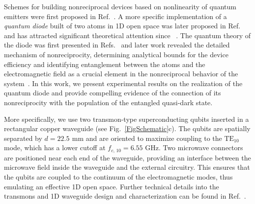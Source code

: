 \documentclass[pra, twocolumn, amsmath, amssymb, notitlepage, longbibliography, showpacs, superscriptaddress]{revtex4-1}
\begin{document}

Schemes for building nonreciprocal devices based on nonlinearity of quantum emitters were first proposed in Ref.~\cite{Roy2010,Roy2013}.
A more specific implementation of a {\it quantum diode} built of two atoms in 1D open space 
was later proposed in Ref.~\cite{Fratini2014} and has attracted 
significant theoretical attention since ~\cite{Dai2015,Fratini2016,Mascarenhas2016,Fang2017, Muller2017a}. 
The quantum theory of the diode was first presented in 
Refs.~\cite{Dai2015, Fratini2016,Fang2017} and later work revealed 
the detailed mechanism of nonreciprocity, determining analytical bounds for the device efficiency and
identifying entanglement between the atoms and the electromagnetic field
as a crucial element in the nonreciprocal behavior of the system~\cite{Muller2017a}. 
In this work, we present experimental results on the realization of the 
quantum diode and provide compelling evidence of the connection of its 
nonreciprocity with the population of the entangled quasi-dark state.

More specifically, we use two transmon-type superconducting qubits 
inserted in a rectangular copper waveguide (see Fig.~\ref{FigSchematic}c). 
The qubits are spatially separated by $d=22.5~\,\textrm{mm}$
and are oriented to maximize coupling 
to the $\textrm{TE}_{10}$ mode, which has a lower cutoff at $f_{c,\,10}=6.55\textrm{ GHz}$.
Two microwave connectors are positioned near each end of the waveguide, providing 
an interface between the microwave field inside the waveguide and the external circuitry. 
This ensures that the qubits are coupled to the continuum of the electromagnetic 
modes, thus emulating an effective 1D open space. Further technical 
details into the transmons and 1D waveguide design and characterization
can be found in Ref.~\cite{Zanner3001}.
\end{document}
